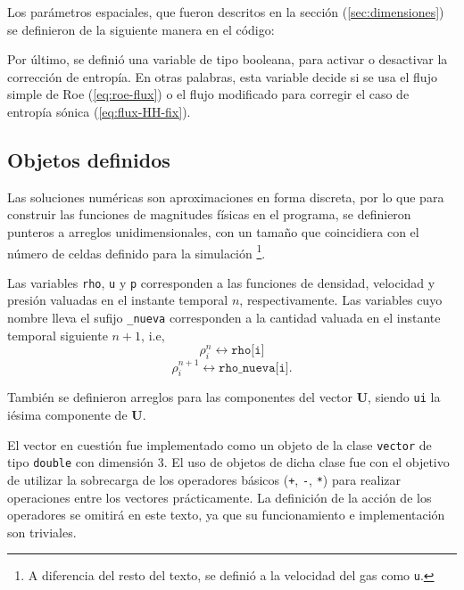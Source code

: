 Los parámetros espaciales, que fueron descritos en la sección (\ref{sec:dimensiones}) se definieron de la siguiente manera en el código:


Por último, se definió una variable de tipo booleana, para activar o desactivar la corrección de entropía. En otras palabras, esta variable decide si se usa el flujo simple de Roe (\ref{eq:roe-flux}) o el flujo modificado para corregir el caso de entropía sónica (\ref{eq:flux-HH-fix}).

\subsection{Objetos definidos}
Las soluciones numéricas son aproximaciones en forma discreta, por lo que para construir las funciones de magnitudes físicas en el programa, se definieron punteros a arreglos unidimensionales, con un tamaño que coincidiera con el número de celdas definido para la simulación \footnote{A diferencia del resto del texto, se definió a la velocidad del gas como \texttt{u}.}.


Las variables \texttt{rho}, \texttt{u} y \texttt{p} corresponden a las funciones de densidad, velocidad y presión valuadas en el instante temporal $n$, respectivamente. Las variables cuyo nombre lleva el sufijo \texttt{\_nueva} corresponden a la cantidad valuada en el instante temporal siguiente $n+1$, i.e,
\begin{equation}
	\rho_{i}^{n} \leftrightarrow \texttt{rho[i]}
\end{equation}
\begin{equation}
	\rho_{i}^{n+1} \leftrightarrow \texttt{rho\_nueva[i]}.
\end{equation}

También se definieron arreglos para las componentes del vector $\mathbf{{U}}$, siendo \texttt{ui} la iésima componente de $\mathbf{{U}}$.


El vector en cuestión fue implementado como un objeto de la clase \texttt{vector} de tipo \texttt{double} con dimensión 3. El uso de objetos de dicha clase fue con el objetivo de utilizar la sobrecarga de los operadores básicos (\texttt{+}, \texttt{-}, \texttt{*}) para realizar operaciones entre los vectores prácticamente. La definición de la acción de los operadores se omitirá en este texto, ya que su funcionamiento e implementación son triviales. 


